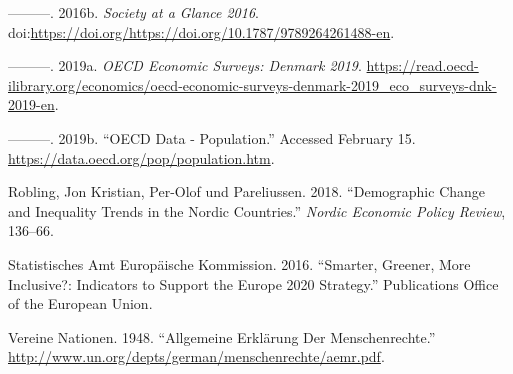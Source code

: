 \documentclass[12pt,]{article}
\begin{document}
\hypertarget{ref-oecd2016society}{}
---------. 2016b. \emph{Society at a Glance 2016}.
doi:\href{https://doi.org/https://doi.org/https://doi.org/10.1787/9789264261488-en}{https://doi.org/https://doi.org/10.1787/9789264261488-en}.

\hypertarget{ref-oecd2019survey}{}
---------. 2019a. \emph{OECD Economic Surveys: Denmark 2019}.
\url{https://read.oecd-ilibrary.org/economics/oecd-economic-surveys-denmark-2019_eco_surveys-dnk-2019-en}.

\hypertarget{ref-oecdpop}{}
---------. 2019b. ``OECD Data - Population.'' Accessed February 15.
\url{https://data.oecd.org/pop/population.htm}.

\hypertarget{ref-robling2018demographic}{}
Robling, Jon Kristian, Per-Olof und Pareliussen. 2018. ``Demographic
Change and Inequality Trends in the Nordic Countries.'' \emph{Nordic
Economic Policy Review}, 136--66.

\hypertarget{ref-europe2020}{}
Statistisches Amt Europäische Kommission. 2016. ``Smarter, Greener, More
Inclusive?: Indicators to Support the Europe 2020 Strategy.''
Publications Office of the European Union.

\hypertarget{ref-Menschenr}{}
Vereine Nationen. 1948. ``Allgemeine Erklärung Der Menschenrechte.''
\url{http://www.un.org/depts/german/menschenrechte/aemr.pdf}.
\end{document}
